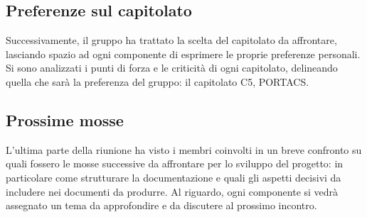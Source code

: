 \subsection{Preferenze sul capitolato}
Successivamente, il gruppo ha trattato la scelta del capitolato da affrontare, lasciando spazio ad ogni componente di esprimere le proprie preferenze personali. Si sono analizzati i punti di forza e le criticità di ogni capitolato, delineando quella che sarà la preferenza del gruppo: il capitolato C5, PORTACS.

\subsection{Prossime mosse}
L'ultima parte della riunione ha visto i membri coinvolti in un breve confronto su quali fossero le mosse successive da affrontare per lo sviluppo del progetto: in particolare come strutturare la documentazione e quali gli aspetti decisivi da includere nei documenti da produrre. Al riguardo, ogni componente si vedrà assegnato un tema da approfondire e da discutere al prossimo incontro.






